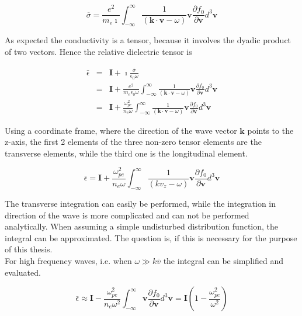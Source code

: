 \documentclass[a4paper,11pt]{thesis}
\begin{document}
\begin{equation}
\overline{\sigma} =   \frac{e^2}{m_e \imath} \int_{-\infty}^{\infty} \frac{1}{ (\textbf{k} \cdot \mathbf{v}-\omega)}\mathbf{v} \frac{\partial f_0}{\partial \mathbf{v}} d^3 \mathbf{v}
\end{equation}

As expected the conductivity is a tensor, because it involves the dyadic product of two vectors. Hence the relative dielectric tensor is

\begin{eqnarray}
\bar{\epsilon} &=& \mathbf{I} + \imath \frac{\overline{\sigma}}{\epsilon_0 \omega}\\
&=&\mathbf{I} +  \frac{e^2}{m_e \epsilon_0 \omega}  \int_{-\infty}^{\infty} \frac{1}{ (\textbf{k} \cdot \mathbf{v}-\omega)}\mathbf{v} \frac{\partial f_0}{\partial \mathbf{v}} d^3 \mathbf{v}\\
&=&\mathbf{I} +  \frac{\omega_{pe}^2}{n_e  \omega}  \int_{-\infty}^{\infty} \frac{1}{ (\textbf{k} \cdot \mathbf{v}-\omega)}\mathbf{v} \frac{\partial f_0}{\partial \mathbf{v}} d^3 \mathbf{v}
\end{eqnarray}

Using a coordinate frame, where the direction of the wave vector $\mathbf{k}$ points to the z-axis, the first 2 elements of the three non-zero tensor elements are the transverse elements, while the third one is the longitudinal element.

\begin{equation}
\bar{\epsilon} =\mathbf{I} +  \frac{\omega_{pe}^2}{n_e  \omega}  \int_{-\infty}^{\infty} \frac{1}{ (k  v_z-\omega)}\mathbf{v} \frac{\partial f_0}{\partial \mathbf{v}} d^3 \mathbf{v}
\end{equation}

The transverse integration can easily be performed, while the integration in direction of the wave is more complicated and can not be performed  \\
analytically. When assuming a simple undisturbed distribution function, the integral can be approximated. The question is, if this is necessary for the purpose of this thesis. \\

For high frequency waves, i.e. when $\omega \gg k\overline{v}$ the integral can be simplified and evaluated.

\begin{equation}
\bar{\epsilon} \approx \mathbf{I} -  \frac{\omega_{pe}^2}{n_e  \omega^2}  \int_{-\infty}^{\infty} \mathbf{v} \frac{\partial f_0}{\partial \mathbf{v}} d^3 \mathbf{v}=\mathbf{I}\left( 1 -  \frac{\omega_{pe}^2}{  \omega^2}\right)
\end{equation}
\end{document}
